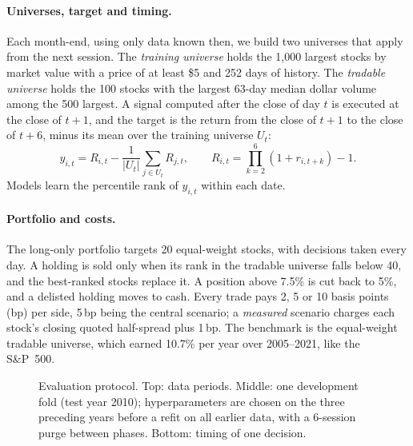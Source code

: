 \paragraph{Universes, target and timing.}
Each month-end, using only data known then, we build two universes that apply from the next session.
The \emph{training universe} holds the 1,000 largest stocks by market value with a price of at least \$5 and 252 days of history.
The \emph{tradable universe} holds the 100 stocks with the largest 63-day median dollar volume among the 500 largest.
A signal computed after the close of day $t$ is executed at the close of $t{+}1$, and the target is the return from the close of $t{+}1$ to the close of $t{+}6$, minus its mean over the training universe $U_t$:
\begin{equation}
y_{i,t} = R_{i,t} - \frac{1}{|U_t|}\sum_{j\in U_t} R_{j,t},\qquad R_{i,t} = \prod_{k=2}^{6} (1 + r_{i,t+k}) - 1.
\label{eq:target}
\end{equation}
Models learn the percentile rank of $y_{i,t}$ within each date.

\paragraph{Portfolio and costs.}
The long-only portfolio targets 20 equal-weight stocks, with decisions taken every day.
A holding is sold only when its rank in the tradable universe falls below 40, and the best-ranked stocks replace it.
A position above 7.5\% is cut back to 5\%, and a delisted holding moves to cash.
Every trade pays 2, 5 or 10 basis points (bp) per side, 5\,bp being the central scenario; a \emph{measured} scenario charges each stock's closing quoted half-spread plus 1\,bp.
The benchmark is the equal-weight tradable universe, which earned 10.7\% per year over 2005--2021, like the S\&P~500.

\begin{figure}[t]
\centering

\caption{Evaluation protocol. Top: data periods. Middle: one development fold (test year 2010); hyperparameters are chosen on the three preceding years before a refit on all earlier data, with a 6-session purge between phases. Bottom: timing of one decision.}
\label{fig:protocol}
\end{figure}

